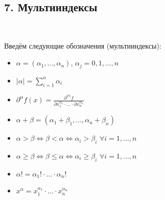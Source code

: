 \documentclass[book, 11pt]{report}
\begin{document}
        \subsection*{7. Мультииндексы}
        \setcounter{equation}{0}
        \par{\ }
        \par{Введём следующие обозначения (мультииндексы): }
        \begin{itemize}
            \item \par{$\alpha=(\alpha_1,\ldots,\alpha_n)$, $\alpha_j=0,1,\ldots,n$}
            \item \par{$|\alpha|=\displaystyle\sum_{i=1}^n\alpha_i$}
            \item \par{$\displaystyle\partial^{\alpha}f(x)=\frac{\partial^{|\alpha|}f}{\partial x_1^{\alpha_1}\cdot\ldots\cdot\partial x_n^{\alpha_n}}$}
            \item \par{$\alpha+\beta=(\alpha_1+\beta_1,\ldots,\alpha_n+\beta_n)$}
            \item \par{$\alpha>\beta\Leftrightarrow\beta<\alpha\Leftrightarrow\alpha_i>\beta_i$ $\forall i=1,\ldots,n$}
            \item \par{$\alpha\geq\beta\Leftrightarrow\beta\leq\alpha\Leftrightarrow\alpha_i\geq\beta_i$ $\forall i=1,\ldots,n$}
            \item \par{$\alpha!=\alpha_1!\cdot\ldots\cdot\alpha_n!$}
            \item \par{$x^{\alpha}=x_1^{\alpha_1}\cdot\ldots\cdot x_n^{\alpha_n}$}
        \end{itemize}
        \vspace{0.5cm}
\end{document}
